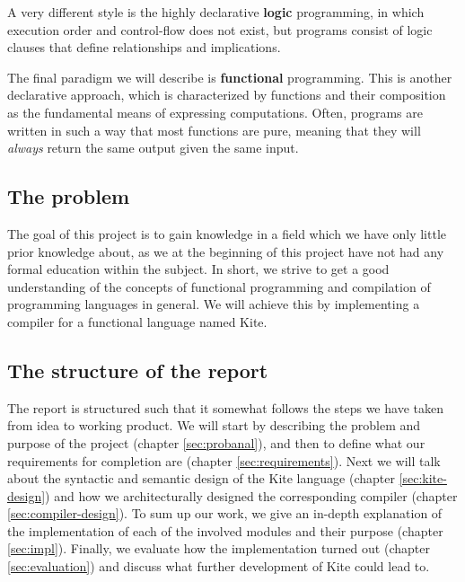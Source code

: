 A very different style is the highly declarative \textbf{logic} programming, in which execution order and control-flow does not exist, but programs consist of logic clauses that define relationships and implications.

The final paradigm we will describe is \textbf{functional} programming. This is another declarative approach, which is characterized by functions and their composition as the fundamental means of expressing computations. Often, programs are written in such a way that most functions are pure, meaning that they will \emph{always} return the same output given the same input.

\subsection{The problem}
The goal of this project is to gain knowledge in a field which we have only little prior knowledge about, as we at the beginning of this project have not had any formal education within the subject. In short, we strive to get a good understanding of the concepts of functional programming and compilation of programming languages in general. We will achieve this by implementing a compiler for a functional language named Kite.

\subsection{The structure of the report}
The report is structured such that it somewhat follows the steps we have taken from idea to working product. We will start by describing the problem and purpose of the project (chapter \ref{sec:probanal}), and then to define what our requirements for completion are (chapter \ref{sec:requirements}). Next we will talk about the syntactic and semantic design of the Kite language (chapter \ref{sec:kite-design}) and how we architecturally designed the corresponding compiler (chapter \ref{sec:compiler-design}). To sum up our work, we give an in-depth explanation of the implementation of each of the involved modules and their purpose (chapter \ref{sec:impl}). Finally, we evaluate how the implementation turned out (chapter \ref{sec:evaluation}) and discuss what further development of Kite could lead to.
